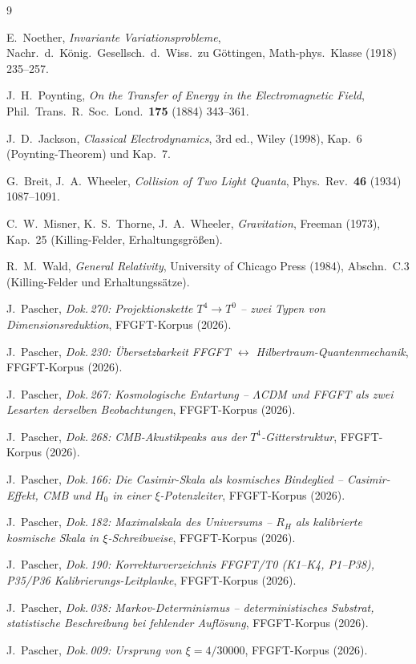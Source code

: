 \begin{thebibliography}{9}

E.~Noether,
\emph{Invariante Variationsprobleme},
Nachr.\ d.\ König.\ Gesellsch.\ d.\ Wiss.\ zu Göttingen,
Math-phys.\ Klasse (1918) 235--257.

J.~H.~Poynting,
\emph{On the Transfer of Energy in the Electromagnetic Field},
Phil.\ Trans.\ R.\ Soc.\ Lond.\ \textbf{175} (1884) 343--361.

J.~D.~Jackson,
\emph{Classical Electrodynamics}, 3rd ed.,
Wiley (1998), Kap.~6 (Poynting-Theorem) und Kap.~7.

G.~Breit, J.~A.~Wheeler,
\emph{Collision of Two Light Quanta},
Phys.\ Rev.\ \textbf{46} (1934) 1087--1091.

C.~W.~Misner, K.~S.~Thorne, J.~A.~Wheeler,
\emph{Gravitation},
Freeman (1973), Kap.~25 (Killing-Felder, Erhaltungsgrößen).

R.~M.~Wald,
\emph{General Relativity},
University of Chicago Press (1984), Abschn.~C.3 (Killing-Felder und
Erhaltungssätze).

J.~Pascher, \emph{Dok.\,270: Projektionskette $T^4\to T^0$ -- zwei Typen von
Dimensionsreduktion}, FFGFT-Korpus (2026).

J.~Pascher, \emph{Dok.\,230: Übersetzbarkeit FFGFT $\leftrightarrow$
Hilbertraum-Quantenmechanik}, FFGFT-Korpus (2026).

J.~Pascher, \emph{Dok.\,267: Kosmologische Entartung -- $\Lambda$CDM und FFGFT
als zwei Lesarten derselben Beobachtungen}, FFGFT-Korpus (2026).

J.~Pascher, \emph{Dok.\,268: CMB-Akustikpeaks aus der $T^4$-Gitterstruktur},
FFGFT-Korpus (2026).

J.~Pascher, \emph{Dok.\,166: Die Casimir-Skala als kosmisches Bindeglied --
Casimir-Effekt, CMB und $H_0$ in einer $\xi$-Potenzleiter},
FFGFT-Korpus (2026).

J.~Pascher, \emph{Dok.\,182: Maximalskala des Universums -- $R_H$ als
kalibrierte kosmische Skala in $\xi$-Schreibweise}, FFGFT-Korpus (2026).

J.~Pascher, \emph{Dok.\,190: Korrekturverzeichnis FFGFT/T0 (K1--K4, P1--P38),
P35/P36 Kalibrierungs-Leitplanke}, FFGFT-Korpus (2026).

J.~Pascher, \emph{Dok.\,038: Markov-Determinismus -- deterministisches Substrat,
statistische Beschreibung bei fehlender Auflösung}, FFGFT-Korpus (2026).

J.~Pascher, \emph{Dok.\,009: Ursprung von $\xi = 4/30000$}, FFGFT-Korpus (2026).

\end{thebibliography}
